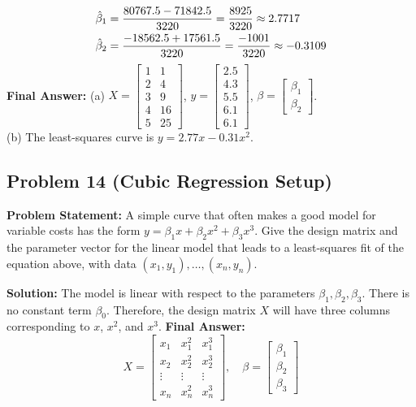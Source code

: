 \documentclass[11pt, letterpaper]{article}
\theoremstyle{definition}
\theoremstyle{remark}
\begin{document}
\begin{align*}
\hat{\beta}_1 &= \frac{80767.5 - 71842.5}{3220} = \frac{8925}{3220} \approx 2.7717 \\ \relax
\hat{\beta}_2 &= \frac{-18562.5 + 17561.5}{3220} = \frac{-1001}{3220} \approx -0.3109
\end{align*}
\textbf{Final Answer:} 
(a) $X = \begin{bmatrix} 1 & 1 \\ 2 & 4 \\ 3 & 9 \\ 4 & 16 \\ 5 & 25 \end{bmatrix}$, $y = \begin{bmatrix} 2.5 \\ 4.3 \\ 5.5 \\ 6.1 \\ 6.1 \end{bmatrix}$, $\beta = \begin{bmatrix} \beta_1 \\ \beta_2 \end{bmatrix}$. \\
(b) The least-squares curve is $\displaystyle y = 2.77x - 0.31x^2$.

\subsection*{Problem 14 (Cubic Regression Setup)}
\textbf{Problem Statement:} A simple curve that often makes a good model for variable costs has the form $y = \beta_1 x + \beta_2 x^2 + \beta_3 x^3$. Give the design matrix and the parameter vector for the linear model that leads to a least-squares fit of the equation above, with data $(x_1, y_1), \dots, (x_n, y_n)$.

\textbf{Solution:}
The model is linear with respect to the parameters $\beta_1, \beta_2, \beta_3$. There is no constant term $\beta_0$. Therefore, the design matrix $X$ will have three columns corresponding to $x$, $x^2$, and $x^3$.
\textbf{Final Answer:}
\[
X = \begin{bmatrix} x_1 & x_1^2 & x_1^3 \\ x_2 & x_2^2 & x_2^3 \\ \vdots & \vdots & \vdots \\ x_n & x_n^2 & x_n^3 \end{bmatrix}, \quad \beta = \begin{bmatrix} \beta_1 \\ \beta_2 \\ \beta_3 \end{bmatrix}
\]
\end{document}
